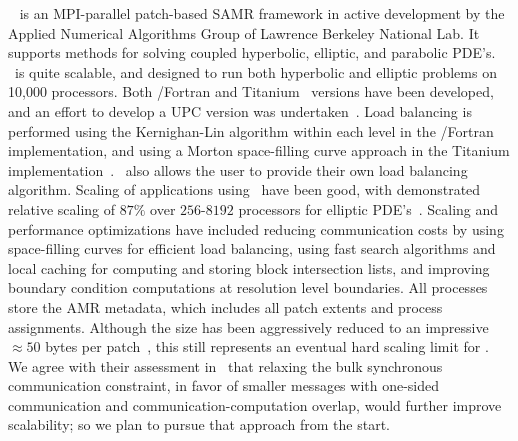 \documentclass[11pt,letterpaper]{article}
\begin{document}
\SUBSUBSECTION{\chombo} 
%
\chombo~\cite{wwwchombo,CoGr09} is an MPI-parallel patch-based
SAMR framework in active development by the Applied Numerical
Algorithms Group of Lawrence Berkeley National Lab.  It supports
methods for solving coupled hyperbolic, elliptic, and parabolic PDE's.
\chombo\ is quite scalable, and designed to run both hyperbolic and
elliptic problems on 10,000 processors.  Both \cpp/Fortran and
Titanium~\cite{wwwtitanium,YeSe98} versions have been
developed, and an effort to develop a UPC version was
undertaken~\cite{We04}.  Load balancing is performed using the
Kernighan-Lin algorithm within each level in the \cpp/Fortran
implementation, and using a Morton space-filling curve approach in the
Titanium implementation~\cite{WeSu07}.  \chombo\ also allows the user
to provide their own load balancing algorithm.  Scaling of
applications using \chombo\ have been good, with demonstrated relative scaling
of $87\%$ over $256$-$8192$ processors for elliptic
PDE's~\cite{CoBe07}.  Scaling and performance optimizations have
included reducing communication costs by using space-filling curves
for efficient load balancing, using fast search algorithms and local
caching for computing and storing block intersection lists, and
improving boundary condition computations at resolution level
boundaries.  All processes store the AMR metadata, which includes all
patch extents and process assignments.  Although the size has been
aggressively reduced to an impressive $\approx 50$ bytes per
patch~\cite{CoBe07}, this still represents an eventual hard scaling
limit for \chombo.  We agree with their assessment in~\cite{WeSu07}
that relaxing the bulk synchronous communication constraint, in favor
of smaller messages with one-sided communication and
communication-computation overlap, would further improve scalability;
so we plan to pursue that approach from the start.

\end{document}
